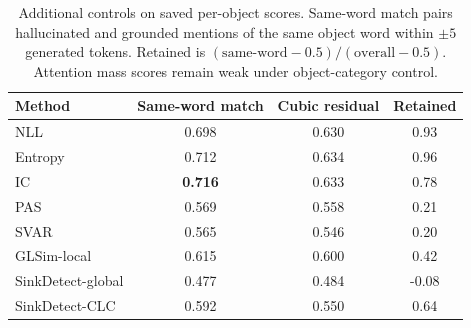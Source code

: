 \begin{table}[t]
\centering
\scriptsize
\setlength{\tabcolsep}{3.0pt}
\begin{tabular}{lccc}
\toprule
Method & Same-word match & Cubic residual & Retained \\
\midrule
NLL & 0.698 & 0.630 & 0.93 \\
Entropy & 0.712 & 0.634 & 0.96 \\
IC & \textbf{0.716} & 0.633 & 0.78 \\
PAS & 0.569 & 0.558 & 0.21 \\
SVAR & 0.565 & 0.546 & 0.20 \\
GLSim-local & 0.615 & 0.600 & 0.42 \\
SinkDetect-global & 0.477 & 0.484 & -0.08 \\
SinkDetect-CLC & 0.592 & 0.550 & 0.64 \\
\bottomrule
\end{tabular}
\caption{Additional controls on saved per-object scores. Same-word match pairs hallucinated and grounded mentions of the same object word within $\pm5$ generated tokens. Retained is $(\mathrm{same\mbox{-}word}-0.5)/(\mathrm{overall}-0.5)$. Attention mass scores remain weak under object-category control.}
\label{tab:strong-controls}
\end{table}
